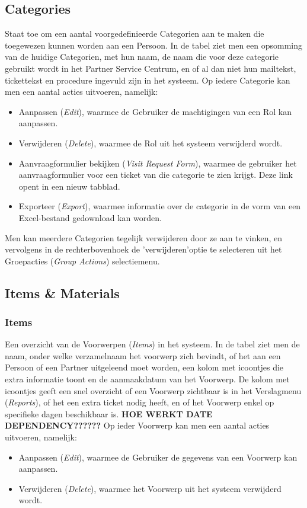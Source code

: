 \documentclass[]{memoir}
\begin{document}
\subsection{Categories}
Staat toe om een aantal voorgedefinieerde Categorien aan te maken die toegewezen kunnen worden aan een Persoon.
In de tabel ziet men een opsomming van de huidige Categorien, met hun naam, de naam die voor deze categorie gebruikt wordt in het Partner Service Centrum, en of al dan niet hun mailtekst, tickettekst en procedure ingevuld zijn in het systeem.
Op iedere Categorie kan men een aantal acties uitvoeren, namelijk:
\begin{itemize}
	\item Aanpassen (\textsl{Edit}), waarmee de Gebruiker de machtigingen van een Rol kan aanpassen.
	\item Verwijderen (\textsl{Delete}), waarmee de Rol uit het systeem verwijderd wordt.
	\item Aanvraagformulier bekijken (\textsl{Visit Request Form}), waarmee de gebruiker het aanvraagformulier voor een ticket van die categorie te zien krijgt. Deze link opent in een nieuw tabblad.
	\item Exporteer (\textsl{Export}), waarmee informatie over de categorie in de vorm van een Excel-bestand gedownload kan worden.
\end{itemize}
Men kan meerdere Categorien tegelijk verwijderen door ze aan te vinken, en vervolgens in de rechterbovenhoek de 'verwijderen'optie te selecteren uit het Groepacties  (\textsl{Group Actions}) selectiemenu.

\subsection{Items \& Materials}
\subsubsection{Items}
Een overzicht van de Voorwerpen (\textsl{Items}) in het systeem. In de tabel ziet men de naam, onder welke verzamelnaam het voorwerp zich bevindt, of het aan een Persoon of een Partner uitgeleend moet worden, een kolom met icoontjes die extra informatie toont en de aanmaakdatum van het Voorwerp.
De kolom met icoontjes geeft een snel overzicht of een Voorwerp zichtbaar is in het Verslagmenu (\textsl{Reports}), of het een extra ticket nodig heeft, en of het Voorwerp enkel op specifieke dagen beschikbaar is.
\textbf{HOE WERKT DATE DEPENDENCY??????}
Op ieder Voorwerp kan men een aantal acties uitvoeren, namelijk:
\begin{itemize}
	\item Aanpassen (\textsl{Edit}), waarmee de Gebruiker de gegevens van een Voorwerp kan aanpassen.
	\item Verwijderen (\textsl{Delete}), waarmee het Voorwerp uit het systeem verwijderd wordt.
\end{itemize}
\end{document}
